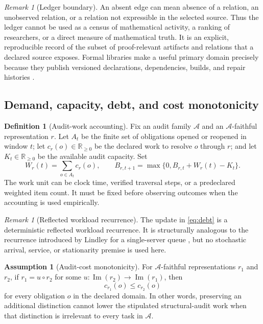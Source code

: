 \documentclass[11pt]{article}
\newcommand{\R}{\mathbb R}
\newcommand{\Img}{\operatorname{Im}}
\newcommand{\mcA}{\mathcal A}
\newcommand{\Debt}{\ensuremath{B}}
\newcommand{\Demand}{\ensuremath{W}}
\newcommand{\AuditCap}{\ensuremath{K}}
\theoremstyle{plain}
\theoremstyle{definition}
\newtheorem{definition}[theorem]{Definition}
\newtheorem{assumption}[theorem]{Assumption}
\theoremstyle{remark}
\newtheorem{remark}[theorem]{Remark}
\begin{document}
\begin{remark}[Ledger boundary]
\label{rem:ledger-boundary}
An absent edge can mean absence of a relation, an unobserved relation, or a
relation not expressible in the selected source.  Thus the ledger cannot be used
as a census of mathematical activity, a ranking of researchers, or a direct
measure of mathematical truth.  It is an explicit, reproducible record of the
subset of proof-relevant artifacts and relations that a declared source exposes.
Formal libraries make a useful primary domain precisely because they publish
versioned declarations, dependencies, builds, and repair histories
\cite{mathlib2020,vanDoorn2020,blanchette2015,huch2024}.
\end{remark}

\subsection{Demand, capacity, debt, and cost monotonicity}

\begin{definition}[Audit-work accounting]
\label{def:accounting}
Fix an audit family $\mcA$ and an $\mcA$-faithful representation $r$.  Let
$A_t$ be the finite set of obligations opened or reopened in window $t$; let
$c_r(o)\in\R_{\geq0}$ be the declared work to resolve $o$ through $r$; and let
$\AuditCap_t\in\R_{\geq0}$ be the available audit capacity.  Set
\[
  \Demand_r(t)=\sum_{o\in A_t}c_r(o),\qquad
  \Debt_{r,t+1}=\max\{0,\Debt_{r,t}+\Demand_r(t)-\AuditCap_t\}.
  \tag{C1}\label{eq:debt}
\]
The work unit can be clock time, verified traversal steps, or a predeclared
weighted item count.  It must be fixed before observing outcomes when the
accounting is used empirically.
\end{definition}

\begin{remark}[Reflected workload recurrence]
The update in \eqref{eq:debt} is a deterministic reflected workload recurrence.
It is structurally analogous to the recurrence introduced by Lindley for a
single-server queue \cite{Lindley1952}, but no stochastic arrival, service, or
stationarity premise is used here.
\end{remark}

\begin{assumption}[Audit-cost monotonicity]
\label{ass:cost}
For $\mcA$-faithful representations $r_1$ and $r_2$, if
$r_1=u\circ r_2$ for some $u:\Img(r_2)\to\Img(r_1)$, then
\[
  c_{r_1}(o)\leq c_{r_2}(o)
\]
for every obligation $o$ in the declared domain.  In other words, preserving
an additional distinction cannot lower the stipulated structural-audit work when
that distinction is irrelevant to every task in $\mcA$.
\end{assumption}
\end{document}
